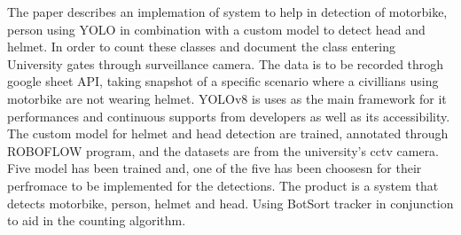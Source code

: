 The paper describes an implemation of system to help in detection of motorbike, person using YOLO in combination with a custom model to detect head and helmet. In order to count these classes and document the class entering University gates through surveillance camera. The data is to be recorded throgh google sheet API, taking snapshot of a specific scenario where a civillians using motorbike are not wearing helmet. YOLOv8 is uses as the main framework for it performances and continuous supports from developers as well as its accessibility. The custom model for helmet and head detection are trained, annotated through ROBOFLOW program, and the datasets are from the university's cctv camera. Five model has been trained and, one of the five has been choosesn for their perfromace to be implemented for the detections. The product is a system that detects motorbike, person, helmet and head. Using BotSort tracker in conjunction to aid in the counting algorithm.